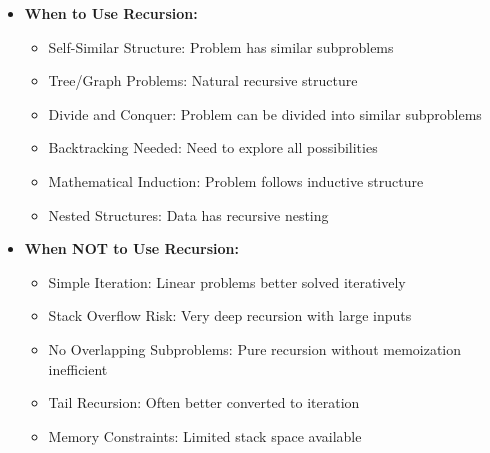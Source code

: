 \documentclass[a4paper,10pt]{book}
\begin{document}
\begin{itemize}[leftmargin=*]
    \item \textbf{When to Use Recursion:}
    \begin{itemize}
        \item Self-Similar Structure: Problem has similar subproblems
        \item Tree/Graph Problems: Natural recursive structure
        \item Divide and Conquer: Problem can be divided into similar subproblems
        \item Backtracking Needed: Need to explore all possibilities
        \item Mathematical Induction: Problem follows inductive structure
        \item Nested Structures: Data has recursive nesting
    \end{itemize}

    \item \textbf{When NOT to Use Recursion:}
    \begin{itemize}
        \item Simple Iteration: Linear problems better solved iteratively
        \item Stack Overflow Risk: Very deep recursion with large inputs
        \item No Overlapping Subproblems: Pure recursion without memoization inefficient
        \item Tail Recursion: Often better converted to iteration
        \item Memory Constraints: Limited stack space available
    \end{itemize}
\end{itemize}
\end{document}
